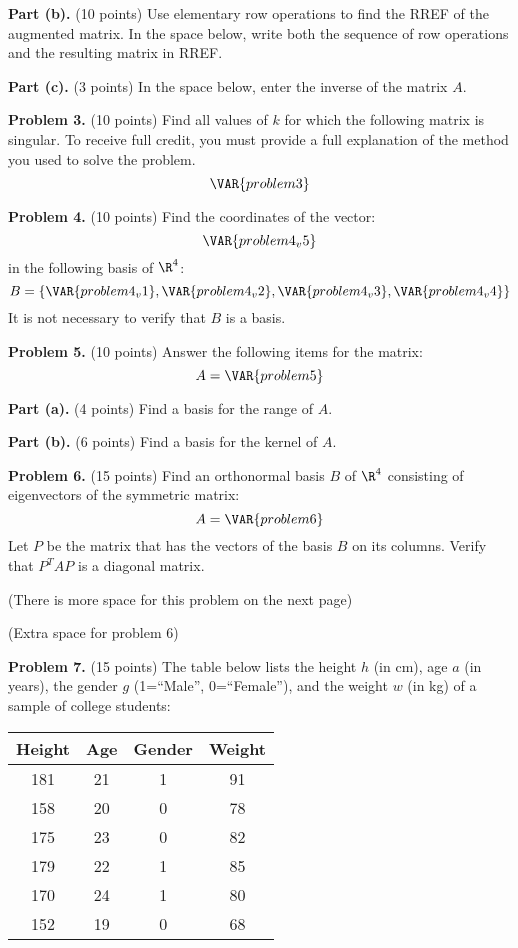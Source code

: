\documentclass[12pt]{article}
\begin{document}
\textbf{Part (b).} (10 points) Use elementary row operations to find the RREF of the augmented matrix.
In the space below, write both the sequence of row operations and the resulting matrix in RREF.

\vskip3.5in

\textbf{Part (c).} (3 points) In the space below, enter the inverse of the matrix $A$.

\clearpage

\textbf{Problem 3.} (10 points) Find all values of $k$ for which the following matrix is singular. To receive full credit, you must provide a full explanation of the method you used to solve the problem.
\[
\VAR{problem3}
\]

\clearpage

\textbf{Problem 4.} (10 points) Find the coordinates of the vector:
\[
\VAR{problem4_v5}
\]
in the following basis of $\R^4$:
\[
B=\left\{
\VAR{problem4_v1},\VAR{problem4_v2},\VAR{problem4_v3},\VAR{problem4_v4}
\right\}
\]
It is not necessary to verify that $B$ is a basis.

\clearpage

\textbf{Problem 5.} (10 points) Answer the following items for the matrix:
\[
A = \VAR{problem5}
\]

\textbf{Part (a).} (4 points) Find a basis for the range of $A$.

\clearpage

\textbf{Part (b).} (6 points) Find a basis for the kernel of $A$.

\clearpage

\textbf{Problem 6.} (15 points) Find an orthonormal basis $B$ of $\R^4$ consisting of eigenvectors of the symmetric matrix:
\[
A = \VAR{problem6}
\]
Let $P$ be the matrix that has the vectors of the basis $B$ on its columns. Verify that $P^TAP$ is a diagonal matrix.

\vfill

(There is more space for this problem on the next page)

\clearpage

(Extra space for problem 6)

\clearpage

\textbf{Problem 7.} (15 points) The table below lists the height $h$ (in cm), age $a$ (in years), the gender $g$ (1=``Male'', 0=``Female''), and the weight $w$ (in kg) of a sample of college students:

\begin{center}
\begin{tabular}{c|c|c|c}
Height & Age & Gender & Weight\\\hline
181 & 21 & 1 & 91\\
158 & 20 & 0 & 78\\
175 & 23 & 0 & 82\\
179 & 22 & 1 & 85\\
170 & 24 & 1 & 80\\
152 & 19 & 0 & 68\\
\end{tabular}
\end{center}
\end{document}
